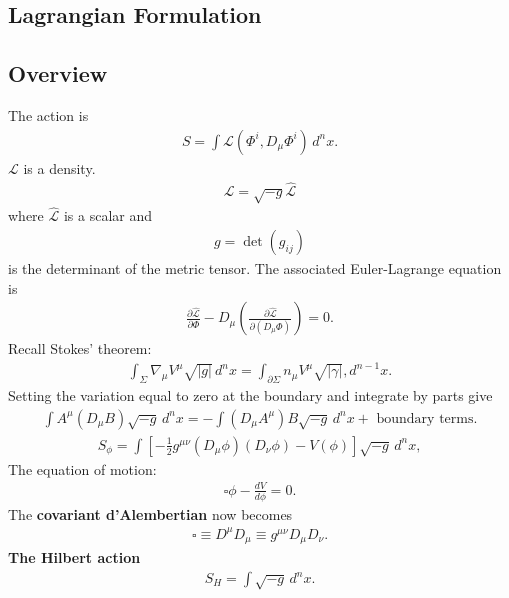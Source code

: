 \documentclass[a4paper,11pt]{article}
\numberwithin{equation}{section}
\theoremstyle{definition}
\newcommand{\p}{\partial}
\newcommand{\lag}{\mathcal{L}}
\begin{document}
\subsection{Lagrangian Formulation}

\subsection{Overview}



The action is
\begin{align}
S = \int \lag (\Phi^i, D_\mu \Phi^i)\,d^nx.
\end{align}
$\lag$ is a density. 
\begin{align}
\lag = \sqrt{-g}\hat{\lag}
\end{align}
where $\hat{\lag}$ is a scalar and
\begin{align}
g = \det(g_{ij})
\end{align}
is the determinant of the metric tensor. The associated Euler-Lagrange equation is
\begin{align}
\frac{\p \hat{\lag}}{\p \Phi} - D_\mu \left( \frac{\p \hat{\lag}}{\p (D_\mu \Phi)}\right) = 0.
\end{align}
Recall Stokes' theorem:
\begin{align}
\int_\Sigma \nabla_\mu V^\mu \sqrt{\vert g\vert}\,d^nx = \int_{\p\Sigma} n_\mu V^\mu \sqrt{\vert \gamma \vert},d^{n-1}x.
\end{align}
Setting the variation equal to zero at the boundary and integrate by parts give
\begin{align}
\int A^\mu (D_\mu B)\sqrt{-g}\,d^nx = -\int (D_\mu A^\mu)B\sqrt{-g}\,d^n x + \text{ boundary terms}.
\end{align}
\begin{align}
S_\phi = \int \left[ -\frac{1}{2}g^{\mu\nu}(D_\mu \phi)(D_\nu\phi) - V(\phi) \right]\sqrt{-g}\,d^nx,
\end{align}
The equation of motion:
\begin{align}
\square \phi - \frac{dV}{d\phi} = 0.
\end{align}
The \textbf{covariant d'Alembertian} now becomes
\begin{align}
\square \equiv D^\mu D_\mu \equiv g^{\mu\nu}D_\mu D_\nu.
\end{align}
\textbf{The Hilbert action}
\begin{align}
S_H = \int \sqrt{-g}\,d^nx.
\end{align}
\end{document}
